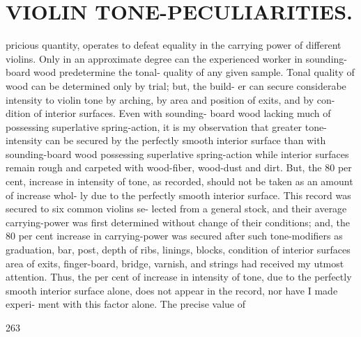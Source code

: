 \documentclass{article}
\begin{document}
\section*{VIOLIN TONE-PECULIARITIES.}
pricious quantity, operates to defeat equality in the carrying power of different violins. Only in an approximate degree can the experienced worker in sounding-board wood predetermine the tonal- quality of any given sample. Tonal quality of wood can be determined only by trial; but, the build- er can secure considerabe intensity to violin tone by arching, by area and position of exits, and by con- dition of interior surfaces. Even with sounding- board wood lacking much of possessing superlative spring-action, it is my observation that greater tone-intensity can be secured by the perfectly smooth interior surface than with sounding-board wood possessing superlative spring-action while interior surfaces remain rough and carpeted with wood-fiber, wood-dust and dirt. But, the 80 per cent, increase in intensity of tone, as recorded, should not be taken as an amount of increase whol- ly due to the perfectly smooth interior surface. This record was secured to six common violins se- lected from a general stock, and their average carrying-power was first determined without change of their conditions; and, the 80 per cent increase in carrying-power was secured after such tone-modifiers as graduation, bar, post, depth of ribs, linings, blocks, condition of interior surfaces area of exits, finger-board, bridge, varnish, and strings had received my utmost attention. Thus, the per cent of increase in intensity of tone, due to the perfectly smooth interior surface alone, does not appear in the record, nor have I made experi- ment with this factor alone. The precise value of

263
\end{document}
